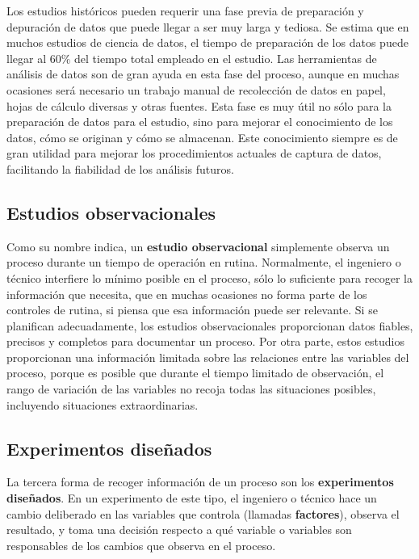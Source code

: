 \documentclass[
  letterpaper,
]{scrbook}
\begin{document}
Los estudios históricos pueden requerir una fase previa de preparación y
depuración de datos que puede llegar a ser muy larga y tediosa. Se
estima que en muchos estudios de ciencia de datos, el tiempo de
preparación de los datos puede llegar al \(60\%\) del tiempo total
empleado en el estudio. Las herramientas de análisis de datos son de
gran ayuda en esta fase del proceso, aunque en muchas ocasiones será
necesario un trabajo manual de recolección de datos en papel, hojas de
cálculo diversas y otras fuentes. Esta fase es muy útil no sólo para la
preparación de datos para el estudio, sino para mejorar el conocimiento
de los datos, cómo se originan y cómo se almacenan. Este conocimiento
siempre es de gran utilidad para mejorar los procedimientos actuales de
captura de datos, facilitando la fiabilidad de los análisis futuros.

\hypertarget{estudios-observacionales}{%
\subsection{Estudios observacionales}\label{estudios-observacionales}}

Como su nombre indica, un \textbf{estudio observacional} simplemente
observa un proceso durante un tiempo de operación en rutina.
Normalmente, el ingeniero o técnico interfiere lo mínimo posible en el
proceso, sólo lo suficiente para recoger la información que necesita,
que en muchas ocasiones no forma parte de los controles de rutina, si
piensa que esa información puede ser relevante. Si se planifican
adecuadamente, los estudios observacionales proporcionan datos fiables,
precisos y completos para documentar un proceso. Por otra parte, estos
estudios proporcionan una información limitada sobre las relaciones
entre las variables del proceso, porque es posible que durante el tiempo
limitado de observación, el rango de variación de las variables no
recoja todas las situaciones posibles, incluyendo situaciones
extraordinarias.

\hypertarget{experimentos-diseuxf1ados}{%
\subsection{Experimentos diseñados}\label{experimentos-diseuxf1ados}}

{}

La tercera forma de recoger información de un proceso son los
\textbf{experimentos diseñados}. En un experimento de este tipo, el
ingeniero o técnico hace un cambio deliberado en las variables que
controla (llamadas \textbf{factores}), observa el resultado, y toma una
decisión respecto a qué variable o variables son responsables de los
cambios que observa en el proceso.
\end{document}
